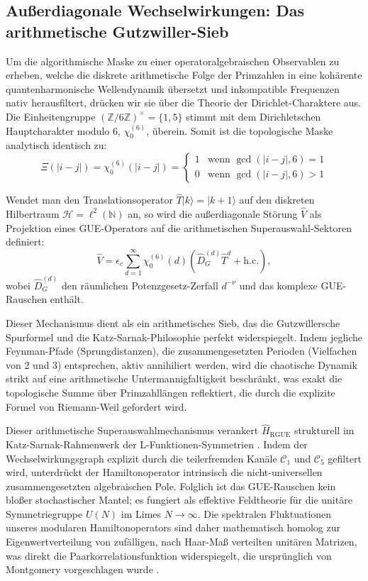 \documentclass[aps,prl,preprint,superscriptaddress,floatfix]{revtex4-2}
\newcommand{\N}{\mathbb{N}}
\newcommand{\Hilb}{\mathcal{H}}
\newcommand{\Zmod}{\mathbb{Z}/6\mathbb{Z}}
\begin{document}
\subsection{Außerdiagonale Wechselwirkungen: Das arithmetische Gutzwiller-Sieb}

Um die algorithmische Maske zu einer operatoralgebraischen Observablen zu erheben, welche die diskrete arithmetische Folge der Primzahlen in eine kohärente quantenharmonische Wellendynamik übersetzt und inkompatible Frequenzen nativ herausfiltert, drücken wir sie über die Theorie der Dirichlet-Charaktere aus. Die Einheitengruppe $(\Zmod)^\times = \{1, 5\}$ stimmt mit dem Dirichletschen Hauptcharakter modulo 6, $\chi_0^{(6)}$, überein. Somit ist die topologische Maske analytisch identisch zu:
\begin{equation}
\Xi(|i-j|) = \chi_0^{(6)}(|i-j|) = \begin{cases} 
1 & \text{wenn } \gcd(|i-j|, 6) = 1 \\ 
0 & \text{wenn } \gcd(|i-j|, 6) > 1 
\end{cases}
\end{equation}

Wendet man den Translationsoperator $\hat{T}|k\rangle = |k+1\rangle$ auf den diskreten Hilbertraum $\Hilb = \ell^2(\N)$ an, so wird die außerdiagonale Störung $\hat{V}$ als Projektion eines GUE-Operators auf die arithmetischen Superauswahl-Sektoren definiert:
\begin{equation}
\label{eq:interaction}
\hat{V} = \epsilon_c \sum_{d=1}^{\infty} \chi_0^{(6)}(d) \left( \hat{D}_G^{(d)} \hat{T}^d + \text{h.c.} \right),
\end{equation}
wobei $\hat{D}_G^{(d)}$ den räumlichen Potenzgesetz-Zerfall $d^{-\nu}$ und das komplexe GUE-Rauschen enthält. 

Dieser Mechanismus dient als ein arithmetisches Sieb, das die Gutzwillersche Spurformel und die Katz-Sarnak-Philosophie perfekt widerspiegelt. Indem jegliche Feynman-Pfade (Sprungdistanzen), die zusammengesetzten Perioden (Vielfachen von 2 und 3) entsprechen, aktiv annihiliert werden, wird die chaotische Dynamik strikt auf eine arithmetische Untermannigfaltigkeit beschränkt, was exakt die topologische Summe über Primzahllängen reflektiert, die durch die explizite Formel von Riemann-Weil gefordert wird.

Dieser arithmetische Superauswahlmechanismus verankert $\hat{H}_{\text{RGUE}}$ strukturell im Katz-Sarnak-Rahmenwerk der L-Funktionen-Symmetrien \cite{KatzSarnak1999}. Indem der Wechselwirkungsgraph explizit durch die teilerfremden Kanäle $\mathcal{C}_1$ und $\mathcal{C}_5$ gefiltert wird, unterdrückt der Hamiltonoperator intrinsisch die nicht-universellen zusammengesetzten algebraischen Pole. Folglich ist das GUE-Rauschen kein bloßer stochastischer Mantel; es fungiert als effektive Feldtheorie für die unitäre Symmetriegruppe $U(N)$ im Limes $N \to \infty$. Die spektralen Fluktuationen unseres modularen Hamiltonoperators sind daher mathematisch homolog zur Eigenwertverteilung von zufälligen, nach Haar-Maß verteilten unitären Matrizen, was direkt die Paarkorrelationsfunktion widerspiegelt, die ursprünglich von Montgomery vorgeschlagen wurde \cite{Montgomery1973}.
\end{document}
